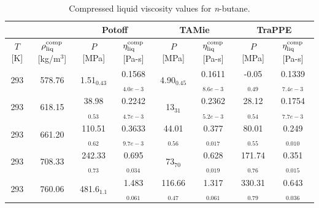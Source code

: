 \documentclass[preprint,review,12pt]{elsarticle}
\begin{document}
	\begin{table}[H]
		\caption{Compressed liquid viscosity values for \textit{n}-butane.}
		\begin{center}
			\begin{tabular}{|c|c|c|c|c|c|c|c|}
				\hline
				&                  & \multicolumn{2}{c|}{Potoff}     & \multicolumn{2}{c|}{TAMie}      & \multicolumn{2}{c|}{TraPPE}    \\ \hline
				$T$ {[}K{]} & $\rho^{\rm comp}_{\rm liq}$ {[}kg/m$^3${]} & $P$ {[}MPa{]}    & $\eta^{\rm comp}_{\rm liq}$ {[}Pa-s{]} & $P$ {[}MPa{]}    & $\eta^{\rm comp}_{\rm liq}$ {[}Pa-s{]} & $P$ {[}MPa{]}   & $\eta^{\rm comp}_{\rm liq}$ {[}Pa-s{]} \\ \hline
				293         & 578.76                                     & 1.51$_{0.43}$    & 0.1568$_{4.0e-3}$                      & 4.90$_{0.45}$    & 0.1611$_{8.6e-3}$                      & -0.05$_{0.49}$  & 0.1339$_{7.4e-3}$                      \\ \hline
				293         & 618.15                                     & 38.98$_{0.53}$   & 0.2242$_{4.7e-3}$                      & 13$_{31}$        & 0.2362$_{5.2e-3}$                      & 28.12$_{0.54}$  & 0.1754$_{7.7e-3}$                      \\ \hline
				293         & 661.20                                     & 110.51$_{0.62}$  & 0.3633$_{9.7e-3}$                      & 44.01$_{0.56}$   & 0.377$_{0.017}$                        & 80.01$_{0.55}$  & 0.249$_{0.010}$                        \\ \hline
				293         & 708.33                                     & 242.33$_{0.73}$  & 0.695$_{0.034}$                        & 73$_{70}$        & 0.628$_{0.019}$                        & 171.74$_{0.76}$ & 0.351$_{0.015}$                        \\ \hline
				293         & 760.06                                     & 481.6$_{1.1}$    & 1.483$_{0.061}$                        & 116.66$_{0.47}$  & 1.317$_{0.061}$                        & 330.31$_{0.79}$ & 0.643$_{0.036}$                        \\ \hline
			\end{tabular}
		\end{center}
	\end{table}
\end{document}
